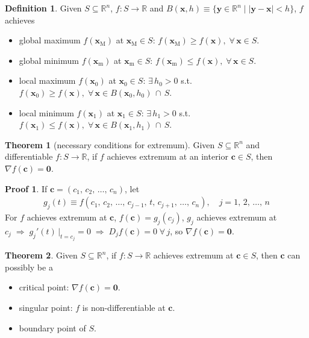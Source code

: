 \documentclass[10pt]{extarticle}
\newcommand{\ds}{\displaystyle}
\newcommand{\ie}{\;\Longrightarrow\;}
\theoremstyle{definition}
\newtheorem*{dfn}{Definition}
\newtheorem*{thm}{Theorem}
\newtheorem*{prf}{Proof}
\newcommand{\vc}{\mathbf{c}}
\newcommand{\vx}{\mathbf{x}}
\newcommand{\vy}{\mathbf{y}}
\newcommand{\vZero}{\mathbf{0}}
\begin{document}
\begin{dfn}
  Given $\ds S\subseteq\mathbb{R}^n$, $\ds f:S\to\mathbb{R}$ and $\ds B(\vx, h)\equiv\{\vy\in\mathbb{R}^n\;|\;|\vy - \vx| < h\}$, $f$ achieves 
  \begin{itemize}%
    \item global maximum $\ds f(\vx_\text{M})$ at $\ds\vx_\text{M}\in S$: $\ds f(\vx_\text{M})\geqslant f(\vx),\;\forall\,\vx\in S$. 
    \item global minimum $\ds f(\vx_\text{m})$ at $\ds \vx_\text{m}\in S$: $\ds f(\vx_\text{m})\leqslant f(\vx),\;\forall\,\vx\in S$. 
    \item local maximum $\ds f(\vx_0)$ at $\ds\vx_0\in S$: $\ds\exists\,h_0 > 0$ s.t. $\ds f(\vx_0)\geqslant f(\vx),\;\forall\,\vx\in B(\vx_0, h_0)\,\cap\,S$. 
    \item local minimum $\ds f(\vx_1)$ at $\ds\vx_1\in S$: $\ds\exists\,h_1 > 0$ s.t. $\ds f(\vx_1)\leqslant f(\vx),\;\forall\,\vx\in B(\vx_1, h_1)\,\cap\,S$. 
  \end{itemize}
\end{dfn}

\newpage

\begin{thm}[necessary conditions for extremum]
  Given $\ds S\subseteq\mathbb{R}^n$ and differentiable $\ds f:S\to\mathbb{R}$, if $f$ achieves extremum at an interior $\vc\in S$, then $\ds\nabla f(\vc) = \vZero$. 
\end{thm}

\begin{prf}
  If $\ds\vc = (c_1,\,c_2,\,\ldots,\,c_n)$, let 
  \begin{align*}
    g_j(t)\equiv f(c_1,\,c_2,\,\ldots,\,c_{j - 1},\,t,\,c_{j + 1},\,\ldots,\,c_n), \quad j = 1,\,2,\,\ldots,\,n 
  \end{align*}
  For $f$ achieves extremum at $\vc$, $f(\vc) = g_j(c_j)$, $g_j$ achieves extremum at $c_j\ie g_j'(t)\,\big|_{t = c_j} = 0 \ie D_j f(\vc) = 0\;\forall\,j$, so $\ds\nabla f(\vc) = \vZero$.  
\end{prf}

\begin{thm}
  Given $\ds S\subseteq\mathbb{R}^n$, if $f:S\to\mathbb{R}$ achieves extremum at $\vc\in S$, then $\vc$ can possibly be a
    \begin{itemize}%
      \item critical point: $\ds \nabla f(\vc) = \vZero$. 
      \item singular point: $f$ is non-differentiable at $\vc$.  
      \item boundary point of $S$. 
    \end{itemize}
\end{thm}
\end{document}
